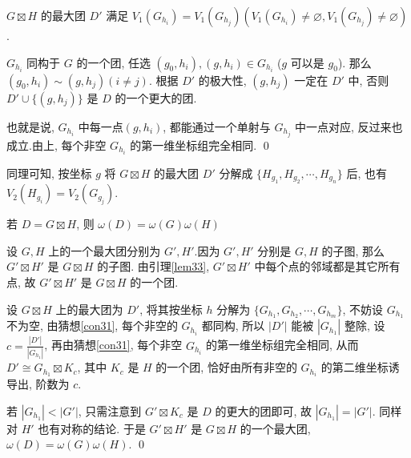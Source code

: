 \documentclass[12pt,a4paper]{article}%
\begin{document}
\begin{Conjecture}\label{con31}
    $G \boxtimes H$ 的最大团 $D'$ 满足 $V_{1}(G_{h_i}) = V_{1}(G_{h_j}) (V_{1}(G_{h_i}) \neq \varnothing, V_{1}(G_{h_j}) \neq \varnothing)$.
\end{Conjecture}
\begin{pf}    
    $G_{h_i}$ 同构于 $G$ 的一个团, 任选 $(g_0,h_i),(g,h_i) \in G_{h_i}$ ($g$ 可以是 $g_0$). 那么 $(g_0,h_i) \sim (g,h_j) (i \neq j)$. 根据 $D'$ 的极大性, $(g,h_j)$ 一定在 $D'$ 中, 否则 $D' \cup \{(g,h_j)\}$ 是 $D$ 的一个更大的团. 

    也就是说, $G_{h_i}$ 中每一点$(g,h_i)$, 都能通过一个单射与 $G_{h_j}$ 中一点对应, 反过来也成立.由上, 每个非空 $G_{h_i}$ 的第一维坐标组完全相同.  \qed
\end{pf}

同理可知, 按坐标 $g$ 将 $G \boxtimes H$ 的最大团 $D'$ 分解成 $\{H_{g_1}, H_{g_2}, \cdots, H_{g_n} \}$ 后, 也有 $V_{2}(H_{g_i}) = V_{2}(G_{g_j})$.

\begin{lemma}\label{lem34}
    若 $D = G \boxtimes H$, 则 $\omega(D) = \omega(G)\omega(H)$
\end{lemma}
\begin{pf}
    设 $G,H$ 上的一个最大团分别为 $G',H'$.因为 $G',H'$ 分别是 $G,H$ 的子图, 那么 $G' \boxtimes H'$ 是 $G \boxtimes H$ 的子图. 由引理\ref{lem33}, $G' \boxtimes H'$ 中每个点的邻域都是其它所有点, 故 $G' \boxtimes H'$ 是 $G \boxtimes H$ 的一个团.

    设 $G \boxtimes H$ 上的最大团为 $D'$, 将其按坐标 $h$ 分解为 $\{G_{h_1}, G_{h_2}, \cdots, G_{h_m} \}$, 不妨设 $G_{h_1}$ 不为空, 由猜想\ref{con31}, 每个非空的 $G_{h_i}$ 都同构, 所以 $|D'|$ 能被 $|G_{h_1}|$ 整除, 设 $c = \frac{|D'|}{|G_{h_1}|}$, 再由猜想\ref{con31}, 每个非空 $G_{h_i}$ 的第一维坐标组完全相同, 从而 $D' \cong G_{h_1} \boxtimes K_c$, 其中 $K_c$ 是 $H$ 的一个团, 恰好由所有非空的 $G_{h_i}$ 的第二维坐标诱导出, 阶数为 $c$.

    若 $|G_{h_1}| < |G'|$, 只需注意到 $G' \boxtimes K_c$ 是 $D$ 的更大的团即可, 故 $|G_{h_1}| = |G'|$. 同样对 $H'$ 也有对称的结论. 于是 $G' \boxtimes H'$ 是 $G \boxtimes H$ 的一个最大团, $\omega(D) = \omega(G)\omega(H)$. \qed
\end{pf}
\end{document}
